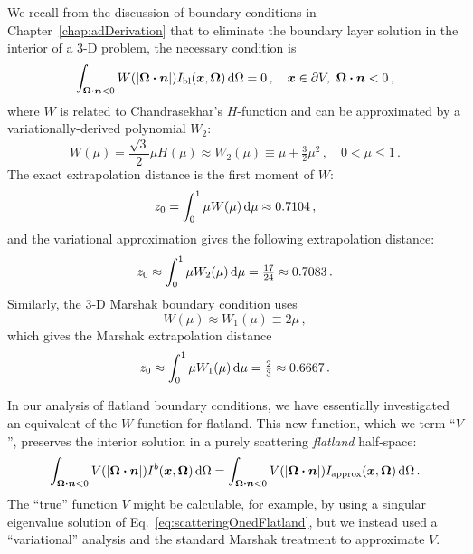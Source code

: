 We recall from the discussion of boundary conditions in
Chapter~\ref{chap:adDerivation} that to eliminate the boundary layer solution
in the interior of a 3-D problem, the necessary condition is
\begin{equation}\label{eq:tdKillBndy_6}
  \int_{\bm{\Omega}\bm{\cdot}\bm{n} < 0}
  W(\left| \bm{\Omega}\bm{\cdot}\bm{n} \right|) I_\mathrm{bl}(\bm{x},\bm{\Omega}) \mathop{}\!\mathrm{d}\Omega
  = 0\,,
  \quad \bm{x}\in \partial V ,\ \bm{\Omega}\bm{\cdot} \bm{n} < 0\,,
\end{equation}
where $W$ is related to Chandrasekhar's $H$-function \cite{Cha1960} and can be
approximated by a variationally-derived polynomial $W_2$:
\begin{equation} \label{eq:chandraW_6}
  W(\mu) = \frac{\sqrt{3}}{2} \mu H(\mu)
  \approx W_2(\mu) \equiv \mu + \tfrac{3}{2} \mu^2 \,, \quad 0 < \mu \le 1 \,.
\end{equation}
The exact extrapolation distance is the first moment of $W$:
\begin{equation*}
  z_0 = \int_{0}^{1} \mu W(\mu) \mathop{}\!\mathrm{d}\mu
  \approx 0.7104\,,
\end{equation*}
and the variational approximation gives the following extrapolation distance:
\begin{equation*}
  z_0 \approx \int_{0}^{1} \mu W_2(\mu) \mathop{}\!\mathrm{d}\mu = \tfrac{17}{24}
  \approx 0.7083\,.
\end{equation*}
Similarly, the 3-D Marshak boundary condition uses
\begin{equation*}
  W(\mu) \approx W_1(\mu) \equiv 2 \mu \,,
\end{equation*}
which gives the Marshak extrapolation distance
\begin{equation*}
  z_0 \approx \int_{0}^{1} \mu W_1(\mu) \mathop{}\!\mathrm{d}\mu = \tfrac{2}{3}
  \approx 0.6667\,.
\end{equation*}

In our analysis of flatland boundary conditions, we have essentially
investigated an equivalent of the $W$ function for flatland. This new 
function, which we term ``$V$'', preserves the interior solution in a purely
scattering \emph{flatland} half-space:
\begin{equation}\label{eq:flatKillBndy}
\int_{\bm{\Omega}\bm{\cdot}\bm{n} < 0} V( \left| \bm{\Omega}\bm{\cdot}\bm{n} \right|)
I^b(\bm{x}, \bm{\Omega}) \mathop{}\!\mathrm{d}\Omega
=
\int_{\bm{\Omega}\bm{\cdot}\bm{n} < 0} V( \left| \bm{\Omega}\bm{\cdot}\bm{n} \right|)
I_\text{approx}(\bm{x}, \bm{\Omega}) \mathop{}\!\mathrm{d}\Omega \,.
\end{equation}
The ``true'' function $V$ might be calculable, for example, by using a
singular eigenvalue solution \cite{Cas1953} of Eq.~\eqref{eq:scatteringOnedFlatland}, but we
instead used a ``variational'' analysis and the standard Marshak treatment to
approximate $V$.

